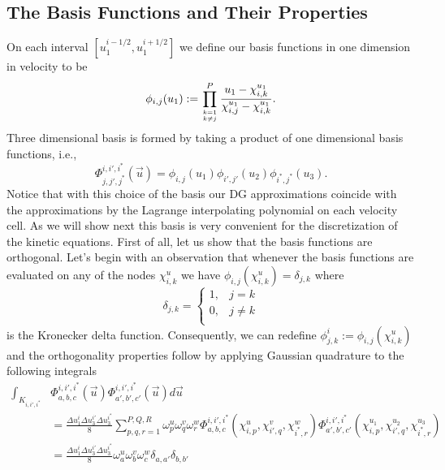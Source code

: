 \subsection{The Basis Functions and Their Properties}
On each interval $[u_1^{i-1/2},u_1^{i+1/2}]$ we define our basis functions in one dimension in velocity to be
%
\begin{equation}
\label{basis}
\phi_{i,j}(u_1) := \prod_{k=1 \atop k \neq j}^P \frac{u_1-\chi_{i,k}^{u_1}}{\chi_{i,j}^{u_1} - \chi_{i,k}^{u_1}}.
\end{equation}
%
Three dimensional basis is formed by taking a product of one dimensional basis functions, i.e., 
%
\begin{equation}
\Phi^{i,i',i^*}_{j,j',j^*}(\vec{u}) = \phi_{i,j}(u_1) \phi_{i',j'}(u_2) \phi_{i^*,j^*}(u_3).
\end{equation}
%
Notice that with this choice of the basis our DG approximations coincide with the approximations by the Lagrange interpolating polynomial on each velocity cell.  As we will show next this basis is very convenient for the discretization of the kinetic equations. First of all, let us show that the basis functions are orthogonal. Let's begin with an observation that whenever the basis functions are evaluated on any of the nodes $\chi_{i,k}^u$ we have $\phi_{i,j}(\chi_{i,k}^u) = \delta_{j,k}$ where
%
\begin{equation}
\delta_{j,k} = \left\{
\begin{array}{ll}
1, & j=k \\
0, & j \ne k \\
\end{array} \right.
\end{equation}
%
is the Kronecker delta function. Consequently, we can redefine $\phi_{j,k}^i := \phi_{i,j}(\chi_{i,k}^u)$ and the orthogonality properties follow by applying Gaussian quadrature to the following integrals
%
\begin{align*}
\int_{K_{i,i',i^*}} &\Phi^{i,i',i^*}_{a,b,c}(\vec{u}) \Phi^{i,i',i^*}_{a',b',c'}(\vec{u}) d\vec{u}\\
&= \frac{\Delta u_1^i \Delta u_3^{i'} \Delta u_3^{i^*}}{8} \sum_{p,q,r=1}^{P,Q,R} \omega_p^u \omega_q^v \omega_r^w \Phi^{i,i',i^*}_{a,b,c}(\chi_{i,p}^u,\chi_{i',q}^v,\chi_{i^*,r}^w) \Phi^{i,i',i^*}_{a',b',c'}(\chi_{i,p}^{u_1},\chi_{i',q}^{u_2},\chi_{i^*,r}^{u_3})\\
&= \frac{\Delta u_1^i \Delta u_3^{i'} \Delta u_3^{i^*}}{8} \omega_a^u \omega_b^v \omega_c^w \delta_{a,a'} \delta_{b,b'}
\end{align*}
